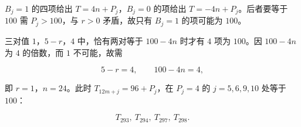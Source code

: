 \begin{answer}
$B_j=1$ 的四项给出 $T=4n+P_j$，$B_j=0$ 的项给出 $T=-4n+P_j$。后者要等于 $100$ 需 $P_j>100$，与 $r>0$ 矛盾，故只有 $B_j=1$ 的项可能为 $100$。

三对值 $1$，$5-r$，$4$ 中，恰有两对等于 $100-4n$ 时才有 $4$ 项为 $100$。因 $100-4n$ 为 $4$ 的倍数，而 $1$ 不可能，故需

\nopagebreak[4]
\[5-r=4,\qquad 100-4n=4,\]

即 $r=1$，$n=24$。此时 $T_{12m+j}=96+P_j$，在 $P_j=4$ 的 $j=5,6,9,10$ 处等于 $100$：

\nopagebreak[4]
\[T_{293},\ T_{294},\ T_{297},\ T_{298}.\]


\end{answer}